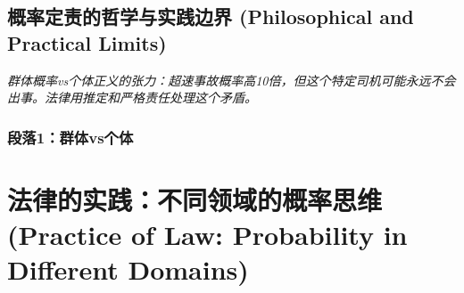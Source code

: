 \documentclass[a4paper,12pt]{book}
\newenvironment{motivation}{\begin{tcolorbox}[colback=gray!10,colframe=gray!60,title=\textit{动机}]\small\itshape}{\end{tcolorbox}}
\begin{document}
	\subsection{概率定责的哲学与实践边界 (Philosophical and Practical Limits)}
	\begin{motivation}
		群体概率vs个体正义的张力：超速事故概率高10倍，但这个特定司机可能永远不会出事。法律用推定和严格责任处理这个矛盾。\end{motivation}
	\subsubsection*{段落1：群体vs个体}


	\section{法律的实践：不同领域的概率思维 (Practice of Law: Probability in Different Domains)}
\end{document}
